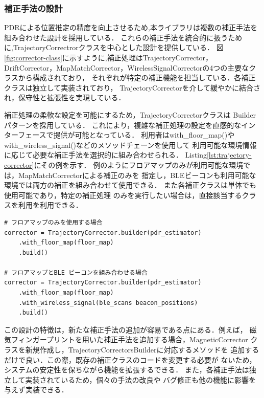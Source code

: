 
\subsubsection{補正手法の設計}

PDRによる位置推定の精度を向上させるため,本ライブラリは複数の補正手法を
組み合わせた設計を採用している．
これらの補正手法を統合的に扱うために,TrajectoryCorrectrorクラスを中心とした設計を提供している．
図\ref{fig:corrector-class}に示すように,補正処理はTrajectoryCorrector，
DriftCorrector，MapMatchCorrector，WirelessSignalCorrectorの4つの主要なクラスから構成されており，
それぞれが特定の補正機能を担当している．各補正クラスは独立して実装されており，
TrajectoryCorrectorを介して緩やかに結合され，保守性と拡張性を実現している．

補正処理の柔軟な設定を可能にするため，TrajectoryCorrectorクラスは
Builderパターンを採用している．
これにより，複雑な補正処理の設定を直感的なインターフェースで提供が可能となっている．
利用者はwith\_floor\_map()やwith\_wireless\_signal()などのメソッドチェーンを使用して
利用可能な環境情報に応じて必要な補正手法を選択的に組み合わせられる．
Listing\ref{lst:trajectory-corrector}にその例を示す．
例のようにフロアマップのみが利用可能な環境では，MapMatchCorrectorによる補正のみを
指定し，BLEビーコンも利用可能な環境では両方の補正を組み合わせて使用できる．
また各補正クラスは単体でも使用可能であり，特定の補正処理
のみを実行したい場合は，直接該当するクラスを利用を利用できる．


\begin{lstlisting}[caption={TrajectoryCorrectorの使用例},label=lst:trajectory-corrector,float=h]
# フロアマップのみを使用する場合
corrector = TrajectoryCorrector.builder(pdr_estimator)
    .with_floor_map(floor_map)
    .build()

# フロアマップとBLE ビーコンを組み合わせる場合
corrector = TrajectoryCorrector.builder(pdr_estimator)
    .with_floor_map(floor_map)
    .with_wireless_signal(ble_scans beacon_positions)
    .build()
\end{lstlisting}

この設計の特徴は，新たな補正手法の追加が容易である点にある．例えば，
磁気フィンガープリントを用いた補正手法を追加する場合，MagneticCorrector
クラスを新規作成し，TrajectoryCorrectorsBuilderに対応するメソッドを
追加するだけで良い．この際，既存の補正クラスのコードを変更する必要が
ないため，システムの安定性を保ちながら機能を拡張するできる．
また，各補正手法は独立して実装されているため，個々の手法の改良や
バグ修正も他の機能に影響を与えず実装できる．

